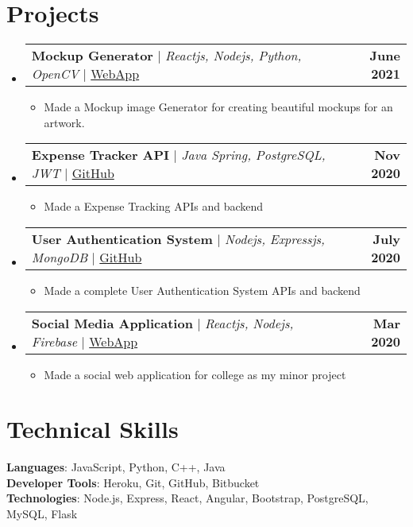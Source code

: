\documentclass[letterpaper,11pt]{article}
\makeatletter
\newcommand{\resumeItem}[1]{
  \item\small{
    {#1 \vspace{-2pt}}
  }
}
\newcommand{\resumeProjectHeading}[2]{
    \item
    \begin{tabular*}{1.001\textwidth}{l@{\extracolsep{\fill}}r}
      \small#1 & \textbf{\small #2} \\
    \end{tabular*}\vspace{-7pt}
}
\newcommand{\resumeSubHeadingListStart}{\begin{itemize}[leftmargin=0.0in, label={}]}
\newcommand{\resumeSubHeadingListEnd}{\end{itemize}}
\newcommand{\resumeItemListStart}{\justify \begin{itemize}}
\newcommand{\resumeItemListEnd}{\end{itemize}\vspace{-5pt}}
\makeatother
\begin{document}
\section{Projects}
    \vspace{-5pt}
    \resumeSubHeadingListStart
        \resumeProjectHeading
            {\textbf{Mockup Generator} $|$ \emph{Reactjs, Nodejs, Python, OpenCV}  $|$ \href{http://mockupgenerator-12159.web.app}{WebApp}}{June 2021}
            \resumeItemListStart
                \resumeItem{Made a Mockup image Generator for creating beautiful mockups for an artwork.}
            \resumeItemListEnd
        \resumeProjectHeading
            {\textbf{Expense Tracker API} $|$ \emph{Java Spring, PostgreSQL, JWT} $|$ \href{https://github.com/owais1412/expense-tracker-api}{GitHub}}{Nov 2020}
            \resumeItemListStart
                \resumeItem{Made a Expense Tracking APIs and backend}
            \resumeItemListEnd
        \resumeProjectHeading
            {\textbf{User Authentication System} $|$ \emph{Nodejs, Expressjs, MongoDB} $|$ \href{https://github.com/owais1412/Node-User-Auth}{GitHub}}{July 2020}
            \resumeItemListStart
                \resumeItem{Made a complete User Authentication System APIs and backend}
            \resumeItemListEnd
        \resumeProjectHeading
            {\textbf{Social Media Application} $|$ \emph{Reactjs, Nodejs, Firebase} $|$ \href{https://svcesocialspace.web.app/login}{WebApp}}{Mar 2020}
            \resumeItemListStart
                \resumeItem{Made a social web application for college as my minor project}
            \resumeItemListEnd
    \resumeSubHeadingListEnd


%
\section{Technical Skills}
 \begin{itemize}[leftmargin=0.15in, label={}]
    {\item{
     \textbf{Languages}{: JavaScript, Python, C++, Java} \\
     \vspace{1pt}
     \textbf{Developer Tools}{: Heroku, Git, GitHub, Bitbucket} \\
     \vspace{1pt}
     \textbf{Technologies}{: Node.js, Express, React, Angular, Bootstrap, PostgreSQL, MySQL, Flask} \\
    }}
 \end{itemize}
 \vspace{-16pt}
\end{document}

